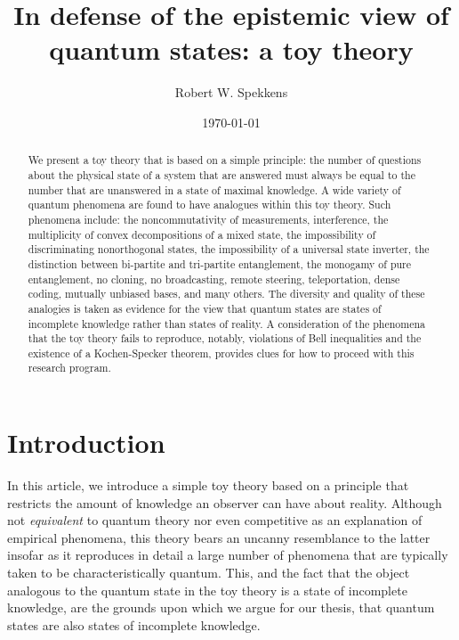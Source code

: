 \documentclass[pra,twocolumn,nofootinbib,showpacs]{revtex4}
\begin{document}
\author{Robert W. Spekkens}
\address{Perimeter Institute for Theoretical Physics,\\
31 Caroline St.~North, Waterloo, Canada N2L 2Y5}
\title{In defense of the epistemic view of quantum states: a toy theory}
\date{\today}

\begin{abstract}
We present a toy theory that is based on a simple principle: the
number of questions about the physical state of a system that are
answered must always be equal to the number that are unanswered in
a state of maximal knowledge. A wide variety of quantum phenomena
are found to have analogues within this toy theory. Such phenomena
include: the noncommutativity of measurements, interference, the
multiplicity of convex decompositions of a mixed state, the
impossibility of discriminating nonorthogonal states, the
impossibility of a universal state inverter, the distinction
between bi-partite and tri-partite entanglement, the monogamy of
pure entanglement, no cloning, no broadcasting, remote steering,
teleportation, dense coding, mutually unbiased bases, and many
others. The diversity and quality of these analogies is taken as
evidence for the view that quantum states are states of incomplete
knowledge rather than states of reality. A consideration of the
phenomena that the toy theory fails to reproduce, notably,
violations of Bell inequalities and the existence of a
Kochen-Specker theorem, provides clues for how to proceed with
this research program.
\end{abstract}

\maketitle
\tableofcontents

\section{Introduction}

\label{intro}

In this article, we introduce a simple toy theory based on a principle that
restricts the amount of knowledge an observer can have about reality.
Although not \emph{equivalent} to quantum theory nor even competitive as an
explanation of empirical phenomena, this theory bears an uncanny resemblance
to the latter insofar as it reproduces in detail a large number of phenomena
that are typically taken to be characteristically quantum. This, and the
fact that the object analogous to the quantum state in the toy theory is a
state of incomplete knowledge, are the grounds upon which we argue for our
thesis, that quantum states are also states of incomplete knowledge.
\end{document}

